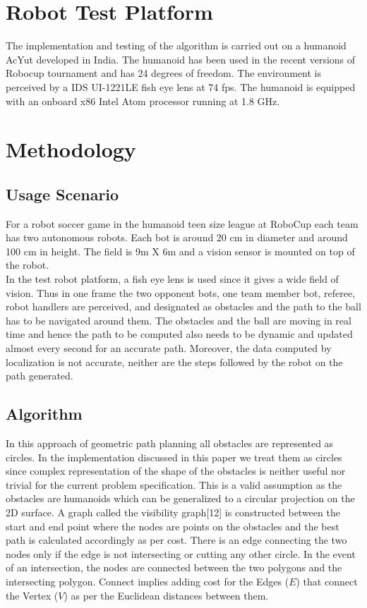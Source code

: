 \documentclass[letterpaper, 10 pt, conference]{ieeeconf}  %
\begin{document}
\section{Robot Test Platform}
The implementation and testing of the algorithm is carried out on a humanoid AcYut developed in India. The humanoid has been used in the recent versions of Robocup tournament and has 24 degrees of freedom. The environment is perceived by a IDS UI-1221LE fish eye lens at 74 fps. The humanoid is equipped with an onboard x86 Intel Atom processor running at 1.8 GHz.

\section{Methodology}
\subsection{Usage Scenario}
For a robot soccer game in the humanoid teen size league at RoboCup each team has two autonomous robots. Each bot is around 20 cm in diameter and around 100 cm in height. The field is 9m X 6m and a vision sensor is mounted on top of the robot. \\
In the test robot platform, a fish eye lens is used since it gives a wide field of vision. Thus in one frame the two opponent bots, one team member bot,
referee, robot handlers are perceived, and designated as obstacles and the path to the ball has to be navigated around them. The obstacles and the ball are moving in real time and hence the path to be computed also needs to be dynamic and updated almost every second for an accurate path. Moreover, the data computed by localization is not accurate, neither are the steps followed by the robot on the path generated.

\subsection{Algorithm}
In this approach of geometric path planning all obstacles are represented as circles. In the implementation discussed in this paper we treat them as circles since complex representation of the shape of the obstacles is neither useful nor trivial for the current problem specification. This is a valid assumption as the obstacles are humanoids which can be generalized to a circular projection on the 2D surface. A graph called the visibility graph[12] is constructed between the start and end point where the nodes are points on the obstacles and the best path is calculated accordingly as per cost. There is an edge connecting the two nodes only if the edge is not intersecting or cutting any other circle. In the event of an intersection, the nodes
are connected between the two polygons and the intersecting polygon. Connect implies adding cost for the Edges ($E$) that connect the Vertex ($V$) as per the Euclidean distances between them.
\end{document}
